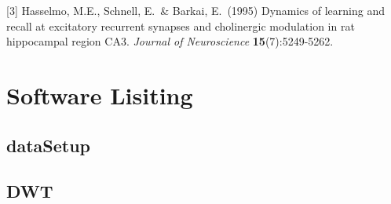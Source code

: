 \documentclass{article}
\begin{document}
[3] Hasselmo, M.E., Schnell, E.\ \& Barkai, E.\ (1995) Dynamics of
learning and recall at excitatory recurrent synapses and cholinergic
modulation in rat hippocampal region CA3. {\it Journal of
  Neuroscience} {\bf 15}(7):5249-5262.


\section{Software Lisiting}\label{Software_Lisiting}
\subsection{dataSetup}
%
\subsection{DWT}
%
\end{document}
